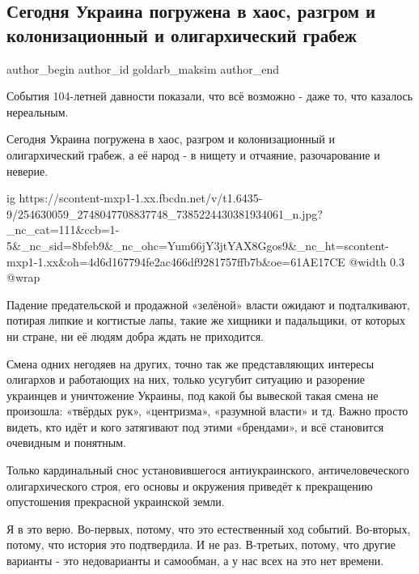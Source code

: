  
 
 
 
 
 
\subsection{Сегодня Украина погружена в хаос, разгром и колонизационный и олигархический грабеж}
\label{sec:07_11_2021.fb.goldarb_maksim.1.ukraina_haos_grabezh}
 
\ifcmt
 author_begin
   author_id goldarb_maksim
 author_end
\fi

События 104-летней давности показали, что всё возможно - даже то, что казалось
нереальным. 

Сегодня Украина погружена в хаос, разгром и колонизационный и олигархический
грабеж, а её народ - в нищету и отчаяние, разочарование и неверие. 

\ifcmt
  ig https://scontent-mxp1-1.xx.fbcdn.net/v/t1.6435-9/254630059_2748047708837748_7385224430381934061_n.jpg?_nc_cat=111&ccb=1-5&_nc_sid=8bfeb9&_nc_ohc=Yum66jY3jtYAX8Ggos9&_nc_ht=scontent-mxp1-1.xx&oh=4d6d167794fe2ac466df9281757ffb7b&oe=61AE17CE
  @width 0.3
  @wrap 
\fi

Падение предательской и продажной «зелёной» власти ожидают и подталкивают,
потирая липкие и когтистые лапы, такие же хищники и падальщики, от которых ни
стране, ни её людям добра ждать не приходится. 

Смена одних негодяев на других, точно так же представляющих интересы олигархов
и работающих на них, только усугубит ситуацию и разорение украинцев и
уничтожение Украины, под какой бы вывеской такая смена не произошла: «твёрдых
рук», «центризма», «разумной власти» и тд. Важно просто видеть, кто идёт и кого
затягивают под этими «брендами», и всё становится очевидным и понятным. 

Только кардинальный снос установившегося антиукраинского, античеловеческого
олигархического строя, его основы и окружения приведёт к прекращению
опустошения прекрасной украинской земли. 

Я в это верю. Во-первых, потому, что это естественный ход событий. Во-вторых,
потому, что история это подтвердила. И не раз. В-третьих, потому, что другие
варианты - это недоварианты и самообман, а у нас всех на это нет времени.

